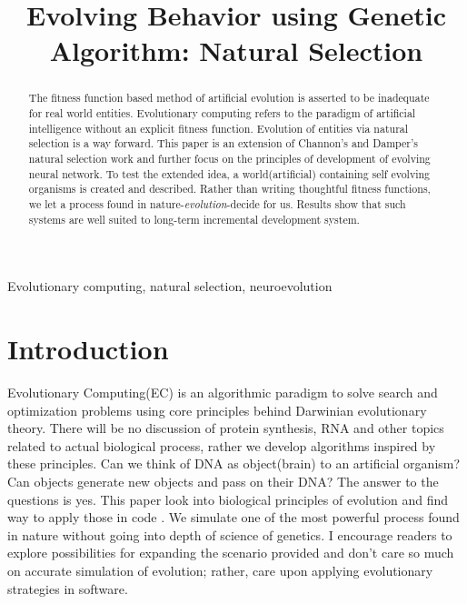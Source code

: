 \documentclass[conference]{IEEEtran}
\begin{document}
\title{Evolving Behavior using Genetic Algorithm: Natural Selection\\
}

\author{
\and
{}
}

\maketitle

\begin{abstract}
The fitness function based method of artificial evolution is asserted to be inadequate for real world entities. Evolutionary computing refers to the paradigm of artificial intelligence without an explicit fitness function. Evolution of entities via natural selection is a way forward.
This paper is an extension of Channon's and Damper's natural selection work and further focus on the principles of development of evolving neural network. To test the extended idea, a world(artificial) containing self evolving organisms is created and described. Rather than writing thoughtful fitness functions, we let a process found in nature-{\textit{evolution}}-decide for us. Results show that such systems are well suited to long-term incremental development system.
\end{abstract}

\begin{IEEEkeywords}
Evolutionary computing, natural selection, neuroevolution
\end{IEEEkeywords}

\section{Introduction}
Evolutionary Computing(EC)\cite{evolvable-machines} is an algorithmic paradigm to solve search and optimization problems using core principles behind Darwinian evolutionary theory. There will be no discussion of protein synthesis, RNA and other topics related to actual biological process, rather we develop algorithms inspired by these principles. Can we think of DNA as  object(brain) to an artificial organism?\cite{Stanley} Can objects generate new objects and pass on their DNA? The answer to the questions is yes. This paper look into biological principles of evolution and find way to apply those in code \cite{algorithms-and-experiments}. We simulate one of the most powerful process found in nature without going into depth of science of genetics. I encourage readers to explore possibilities for expanding the scenario provided and don't care so much on accurate simulation of evolution; rather, care upon applying evolutionary strategies in software.
\end{document}
